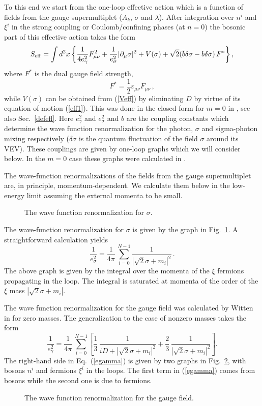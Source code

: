 \documentclass[epsfig,12pt]{article}
\def\beq{\begin{equation}}
\def\eeq{\end{equation}}
\newcommand{\pt}{\partial}
\def\beq{\begin{equation}}
\def\eeq{\end{equation}}
\begin{document}
{To this end we start from the
one-loop effective action which is  a function of fields from the gauge supermultiplet
($A_k$, $\sigma$ and $\lambda$). 
After integration over $n^{i}$ and $\xi^i$ in the strong coupling or Coulomb/confining phases
(at $n=0$)
the bosonic part of this effective action takes the form
\cite{SYhet}
\beq
S_{\rm eff}=
 \int d^2 x \left\{
\frac1{4e_{\gamma}^2}F^2_{\mu\nu} + \frac1{e_{\sigma}^2}
|\pt_{\mu}\sigma|^2
+ V(\sigma)+\sqrt{2}(\bar{b}\delta\sigma- b\delta\bar{\sigma})\,F^{*}
  \right\},
\label{effaction}
\eeq
where 
$F^{*}$ is the  dual gauge field strength,
\beq
F^{*}=\frac12\varepsilon_{\mu\nu}F_{\mu\nu}\,,
\eeq
while $V(\sigma)$ can be obtained from (\ref{Veff}) by eliminating $D$ by virtue of its equation of motion (\ref{eff1}). This was done in the closed form for $m=0$ in \cite{SYhet}, see also Sec.~\ref{defefl}.
Here $e^2_{\gamma}$ and  $e^2_{\sigma}$  and $b$ are the coupling constants which
determine the wave function renormalization for  the photon,  $\sigma$ and sigma-photon mixing
respectively ($\delta \sigma$ is the quantum fluctuation of the field $\sigma$ around its VEV). 
These couplings are given by one-loop graphs which we will consider below. In the $m=0$ case
these graphs were calculated in \cite{SYhet}.

The wave-function renormalizations of  the fields from the gauge supermultiplet are, 
in principle, momentum-dependent. We calculate them below in the low-energy limit assuming 
the external momenta to be small.
\begin{figure}
\epsfxsize=6cm
\centerline{}
\caption{\small
The wave function renormalization for  $\sigma$. }
\label{fig:esigma}
\end{figure}
The wave-function renormalization for $\sigma$ is given by the graph in 
Fig.~\ref{fig:esigma}. A straightforward calculation yields
\beq
\frac1{e^2_{\sigma}}=\frac{1}{4\pi}\,\sum_{i=0}^{N-1}\frac{1}{|\sqrt{2}\sigma+m_i|^2}\,.
\label{esigma}
\eeq
The above graph is given by the integral over
the momenta of the $\xi$ fermions propagating in the loop.
The integral is saturated at momenta of the order of the $\xi$
mass $|\sqrt{2}\sigma+m_i|$.

The wave function renormalization for the gauge field was calculated by Witten in 
\cite{W79} for zero masses. The generalization to the case of nonzero masses takes the form
\beq
\frac1{e^2_{\gamma}}=\frac{1}{4\pi}\,\sum_{i=0}^{N-1}\left[\frac13\,\frac{1}{iD+|\sqrt{2}\sigma+m_i|^2}+
\frac23\,\frac{1}{|\sqrt{2}\sigma+m_i|^2}\right].
\label{egamma}
\eeq
The right-hand side in Eq.~(\ref{egamma}) is given by two graphs in 
Fig.~\ref{fig:photon}, with bosons $n^i$ and fermions $\xi^i$
in the loops. The first term in (\ref{egamma}) comes from bosons while the second
one is due to fermions.
\begin{figure}
\epsfxsize=10cm
\centerline{}
\caption{\small
The wave function renormalization for the gauge field.}
\label{fig:photon}
\end{figure}

}
\end{document}
